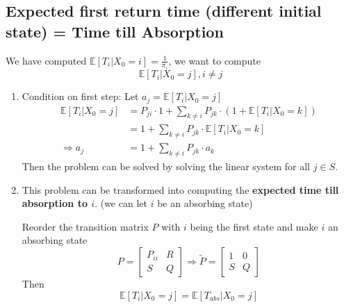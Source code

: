 \documentclass[11pt]{elegantbook}
\begin{document}
\subsection{Expected first return time (different initial state) = Time till Absorption}
We have computed $\mathbb{E}[T_i|X_0=i]=\frac{1}{\pi_i}$, we want to compute $$\mathbb{E}[T_i|X_0=j],i\neq j$$
\begin{enumerate}
    \item Condition on first step: Let $a_j=\mathbb{E}[T_i|X_0=j]$
    \begin{equation}
        \begin{aligned}
            \mathbb{E}[T_i|X_0=j]&=P_{ji}\cdot 1+\sum_{k\neq i}P_{jk}\cdot(1+\mathbb{E}[T_i|X_0=k])\\
            &=1+\sum_{k\neq i}P_{jk}\cdot\mathbb{E}[T_i|X_0=k]\\
            \Rightarrow a_j&=1+\sum_{k\neq i}P_{jk}\cdot a_k
        \end{aligned}
        \nonumber
    \end{equation}
    Then the problem can be solved by solving the linear system for all $j\in S$.
    \item This problem can be transformed into computing the \textbf{expected time till absorption to $i$}. (we can let $i$ be an absorbing state)

    Reorder the transition matrix $P$ with $i$ being the first state and make $i$ an absorbing state $$P=\begin{bmatrix}
        P_{ii}& R\\
        S & Q
    \end{bmatrix} \Rightarrow \tilde{P}=\begin{bmatrix}
        1&0\\
        S&Q
    \end{bmatrix}$$
    Then $$\mathbb{E}[T_i|X_0=j]=\mathbb{E}[T_{abs}|X_0=j]$$
\end{enumerate}
\end{document}
